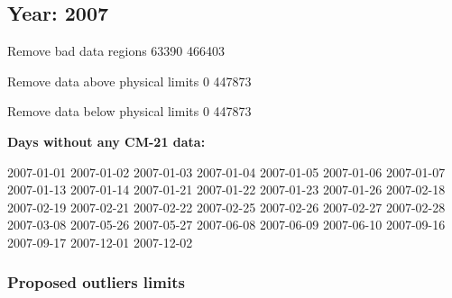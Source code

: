 \documentclass[
  10pt,
  a4paper,oneside]{article}
\begin{document}
\FloatBarrier

\newpage

\hypertarget{year-2007}{%
\subsection{Year: 2007}\label{year-2007}}

Remove bad data regions
63390 466403

Remove data above physical limits
0 447873

Remove data below physical limits
0 447873

\textbf{Days without any CM-21 data:}

2007-01-01 2007-01-02 2007-01-03 2007-01-04 2007-01-05 2007-01-06 2007-01-07 2007-01-13 2007-01-14 2007-01-21 2007-01-22 2007-01-23 2007-01-26 2007-02-18 2007-02-19 2007-02-21 2007-02-22 2007-02-25 2007-02-26 2007-02-27 2007-02-28 2007-03-08 2007-05-26 2007-05-27 2007-06-08 2007-06-09 2007-06-10 2007-09-16 2007-09-17 2007-12-01 2007-12-02

\hypertarget{proposed-outliers-limits-14}{%
\subsubsection{Proposed outliers limits}\label{proposed-outliers-limits-14}}

\footnotesize
\end{document}
